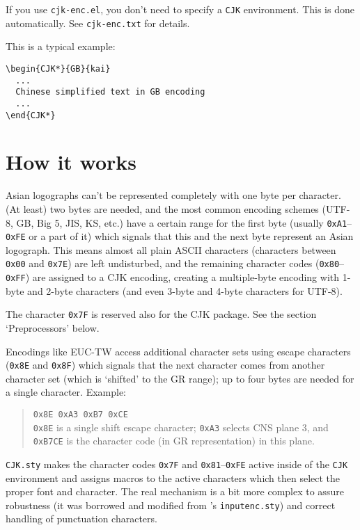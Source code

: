 \documentclass[a4paper, 11pt, draft]{article}
\begin{document}
If you use \texttt{cjk-enc.el}, you don't need to specify a \texttt{CJK} environment. This
is done automatically. See \texttt{cjk-enc.txt} for details.

This is a typical example:
%
\begin{verbatim}
\begin{CJK*}{GB}{kai}
  ...
  Chinese simplified text in GB encoding
  ...
\end{CJK*}
\end{verbatim}



\section{How it works}

Asian logographs can't be represented completely with one byte per
character. (At least) two bytes are needed, and the most common encoding
schemes (UTF-8, GB, Big 5, JIS, KS, etc.) have a certain range for the first
byte (usually \texttt{0xA1}--\texttt{0xFE} or a part of it) which signals that this and the
next byte represent an Asian logograph. This means almost all plain ASCII
characters (characters between \texttt{0x00} and \texttt{0x7E}) are left undisturbed, and the
remaining character codes (\texttt{0x80}--\texttt{0xFF}) are assigned to a CJK encoding,
creating a multiple-byte encoding with 1-byte and 2-byte characters (and
even 3-byte and 4-byte characters for UTF-8).

The character \texttt{0x7F} is reserved also for the \textsf{CJK} package. See the section
`Preprocessors' below.

Encodings like EUC-TW access additional character sets using escape
characters (\texttt{0x8E} and \texttt{0x8F}) which signals that the next character comes
from another character set (which is `shifted' to the GR range); up to
four bytes are needed for a single character. Example:
%
\begin{quote}
  \texttt{0x8E 0xA3 0xB7 0xCE} \\
  \texttt{0x8E} is a single shift escape character; \texttt{0xA3} selects CNS plane 3, and
  \texttt{0xB7CE} is the character code (in GR representation) in this plane.
\end{quote}

\texttt{CJK.sty} makes the character codes \texttt{0x7F} and \texttt{0x81}--\texttt{0xFE} active inside of the
\texttt{CJK} environment and assigns macros to the active characters which then
select the proper font and character. The real mechanism is a bit more
complex to assure robustness (it was borrowed and modified from \LaTeXe's
\texttt{inputenc.sty}) and correct handling of punctuation characters.
\end{document}

